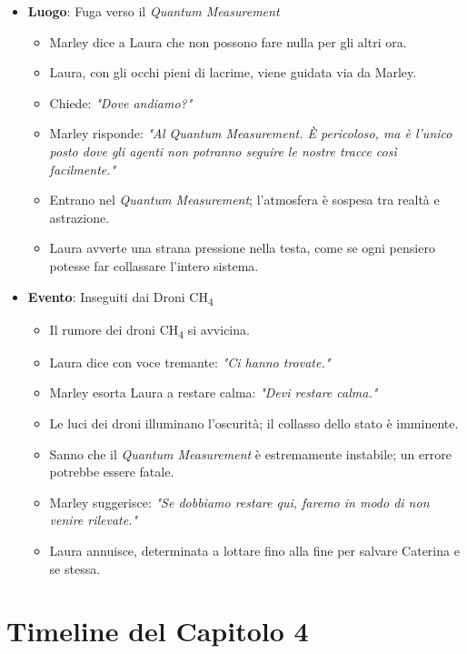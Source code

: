 \begin{itemize}
    \item \textbf{Luogo}: Fuga verso il \emph{Quantum Measurement}
    \begin{itemize}
        \item Marley dice a Laura che non possono fare nulla per gli altri ora.
        \item Laura, con gli occhi pieni di lacrime, viene guidata via da Marley.
        \item Chiede: \emph{"Dove andiamo?"}
        \item Marley risponde: \emph{"Al Quantum Measurement. È pericoloso, ma è l'unico posto dove gli agenti non potranno seguire le nostre tracce così facilmente."}
        \item Entrano nel \emph{Quantum Measurement}; l'atmosfera è sospesa tra realtà e astrazione.
        \item Laura avverte una strana pressione nella testa, come se ogni pensiero potesse far collassare l'intero sistema.
    \end{itemize}

    \item \textbf{Evento}: Inseguiti dai Droni CH\textsubscript{4}
    \begin{itemize}
        \item Il rumore dei droni CH\textsubscript{4} si avvicina.
        \item Laura dice con voce tremante: \emph{"Ci hanno trovate."}
        \item Marley esorta Laura a restare calma: \emph{"Devi restare calma."}
        \item Le luci dei droni illuminano l'oscurità; il collasso dello stato è imminente.
        \item Sanno che il \emph{Quantum Measurement} è estremamente instabile; un errore potrebbe essere fatale.
        \item Marley suggerisce: \emph{"Se dobbiamo restare qui, faremo in modo di non venire rilevate."}
        \item Laura annuisce, determinata a lottare fino alla fine per salvare Caterina e se stessa.
    \end{itemize}
\end{itemize}

\section*{Timeline del Capitolo 4}

